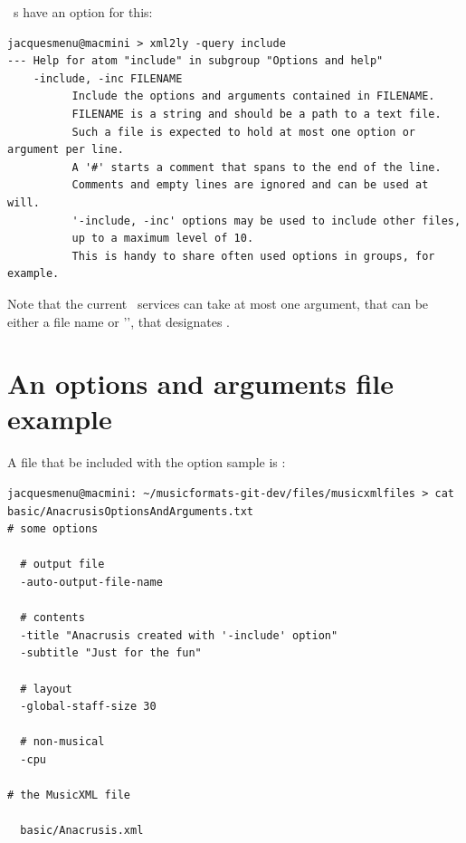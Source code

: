 \mf\ \converter s have an  option for this:
\begin{lstlisting}[language=Terminal]
jacquesmenu@macmini > xml2ly -query include
--- Help for atom "include" in subgroup "Options and help"
    -include, -inc FILENAME
          Include the options and arguments contained in FILENAME.
          FILENAME is a string and should be a path to a text file.
          Such a file is expected to hold at most one option or argument per line.
          A '#' starts a comment that spans to the end of the line.
          Comments and empty lines are ignored and can be used at will.
          '-include, -inc' options may be used to include other files,
          up to a maximum level of 10.
          This is handy to share often used options in groups, for example.
\end{lstlisting}

Note that the current \mf\ services can take at most one argument, that can be either a file name or '\code{-}', that designates \standardInput.


\section{An options and arguments file example}

A file that be included with the option sample is :
\begin{lstlisting}[language=Terminal]
jacquesmenu@macmini: ~/musicformats-git-dev/files/musicxmlfiles > cat basic/AnacrusisOptionsAndArguments.txt
# some options

  # output file
  -auto-output-file-name

  # contents
  -title "Anacrusis created with '-include' option"
  -subtitle "Just for the fun"

  # layout
  -global-staff-size 30

  # non-musical
  -cpu

# the MusicXML file

  basic/Anacrusis.xml
\end{lstlisting}

